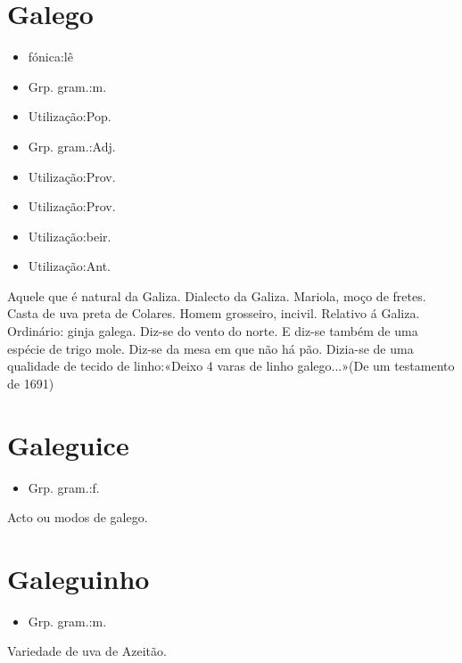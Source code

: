 \section{Galego}
\begin{itemize}
\item {fónica:lê}
\end{itemize}
\begin{itemize}
\item {Grp. gram.:m.}
\end{itemize}
\begin{itemize}
\item {Utilização:Pop.}
\end{itemize}
\begin{itemize}
\item {Grp. gram.:Adj.}
\end{itemize}
\begin{itemize}
\item {Utilização:Prov.}
\end{itemize}
\begin{itemize}
\item {Utilização:Prov.}
\end{itemize}
\begin{itemize}
\item {Utilização:beir.}
\end{itemize}
\begin{itemize}
\item {Utilização:Ant.}
\end{itemize}
Aquele que é natural da Galiza.
Dialecto da Galiza.
Mariola, moço de fretes.
Casta de uva preta de Colares.
Homem grosseiro, incivil.
Relativo á Galiza.
Ordinário: \textunderscore ginja galega\textunderscore .
Diz-se do vento do norte.
E diz-se também de uma espécie de trigo mole.
Diz-se da mesa em que não há pão.
Dizia-se de uma qualidade de tecido de linho:«\textunderscore Deixo 4 varas de linho galego...\textunderscore »(De um testamento de 1691)
\section{Galeguice}
\begin{itemize}
\item {Grp. gram.:f.}
\end{itemize}
Acto ou modos de galego.
\section{Galeguinho}
\begin{itemize}
\item {Grp. gram.:m.}
\end{itemize}
Variedade de uva de Azeitão.

